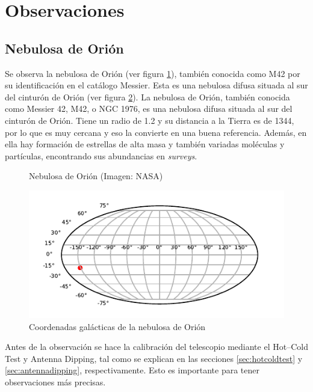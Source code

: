 \section{Observaciones}

\subsection{Nebulosa de Orión}

Se observa la nebulosa de Orión (ver figura \ref{fig:m42}), también conocida como M42 por su identificación en el catálogo Messier. Esta es una nebulosa difusa situada al sur del cinturón de Orión (ver figura \ref{fig:lb}).
La nebulosa de Orión, también conocida como Messier 42, M42, o NGC 1976, es una nebulosa difusa situada al sur del cinturón de Orión. Tiene un radio de \SI{1.2}{\lightyear} y su distancia a la Tierra es de \SI{1344}{\lightyear}, por lo que es muy cercana y eso la convierte en una buena referencia. Además, en ella hay formación de estrellas de alta masa y también variadas moléculas y partículas, encontrando sus abundancias en \textit{surveys}.

\begin{figure}[p]
	\centering
	\caption{Nebulosa de Orión (Imagen: NASA)}
	\label{fig:m42}
\end{figure}

\begin{figure}[p]
	\centering
	\includegraphics{lb.pdf}
	\caption{Coordenadas galácticas de la nebulosa de Orión}
	\label{fig:lb}
\end{figure}

Antes de la observación se hace la calibración del telescopio mediante el Hot--Cold Test y Antenna Dipping, tal como se explican en las secciones \ref{sec:hotcoldtest} y \ref{sec:antennadipping}, respectivamente. Esto es importante para tener observaciones más precisas.


